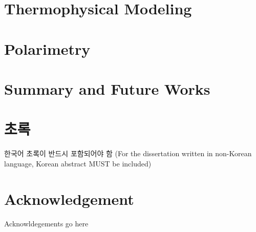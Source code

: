 \documentclass[12pt]{report}
\begin{document}
\chapter{Thermophysical Modeling}\label{c:tpm}



\chapter{Polarimetry}\label{c:pol}


\chapter{Summary and Future Works}


\clearpage




\chapter*{초록}\setcounter{page}{3}
한국어 초록이 반드시 포함되어야 함 (For the dissertation written in non-Korean language, Korean abstract MUST be included)



\chapter*{Acknowledgement}
Acknowldegements go here
\end{document}
